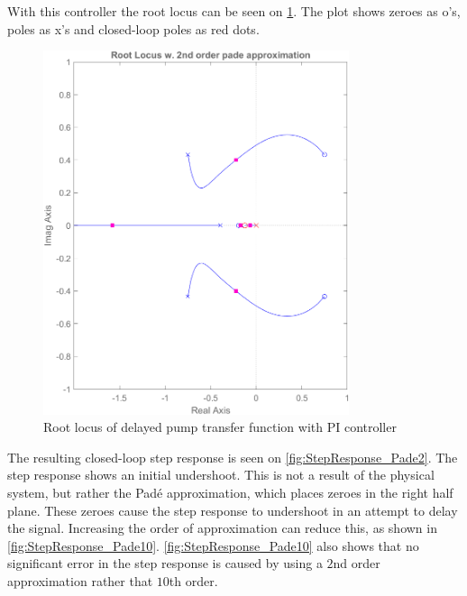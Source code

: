 With this controller the root locus can be seen on \cref{fig:RootLocus_PadeTwo}. The plot shows zeroes as o's, poles as x's and closed-loop poles as red dots.
\begin{figure}[h!]
	\centering
	\includegraphics[width=0.8\textwidth]{Pictures/RootLocus_Pade2.png}
	
	\caption{Root locus of delayed pump transfer function with PI controller}
	\label{fig:RootLocus_PadeTwo}
\end{figure}

The resulting closed-loop step response is seen on \cref{fig:StepResponse_Pade2}. The step response shows an initial undershoot. This is not a result of the physical system, but rather the Padé approximation, which places zeroes in the right half plane. These zeroes cause the step response to undershoot in an attempt to delay the signal. Increasing the order of approximation can reduce this, as shown in \cref{fig:StepResponse_Pade10}. \cref{fig:StepResponse_Pade10} also shows that no significant error in the step response is caused by using a $2$nd order approximation rather that $10$th order.

